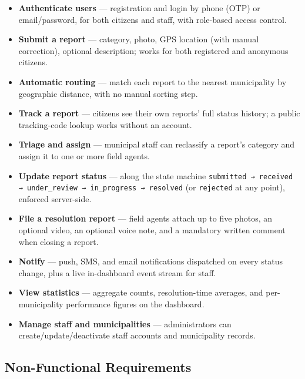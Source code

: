 \begin{itemize}[leftmargin=*]
  \item \textbf{Authenticate users} --- registration and login by phone (OTP) or email/password, for both citizens and staff, with role-based access control.
  \item \textbf{Submit a report} --- category, photo, GPS location (with manual correction), optional description; works for both registered and anonymous citizens.
  \item \textbf{Automatic routing} --- match each report to the nearest municipality by geographic distance, with no manual sorting step.
  \item \textbf{Track a report} --- citizens see their own reports' full status history; a public tracking-code lookup works without an account.
  \item \textbf{Triage and assign} --- municipal staff can reclassify a report's category and assign it to one or more field agents.
  \item \textbf{Update report status} --- along the state machine \texttt{submitted → received → under\_review → in\_progress → resolved} (or \texttt{rejected} at any point), enforced server-side.
  \item \textbf{File a resolution report} --- field agents attach up to five photos, an optional video, an optional voice note, and a mandatory written comment when closing a report.
  \item \textbf{Notify} --- push, SMS, and email notifications dispatched on every status change, plus a live in-dashboard event stream for staff.
  \item \textbf{View statistics} --- aggregate counts, resolution-time averages, and per-municipality performance figures on the dashboard.
  \item \textbf{Manage staff and municipalities} --- administrators can create/update/deactivate staff accounts and municipality records.
\end{itemize}

\subsection{Non-Functional Requirements}

